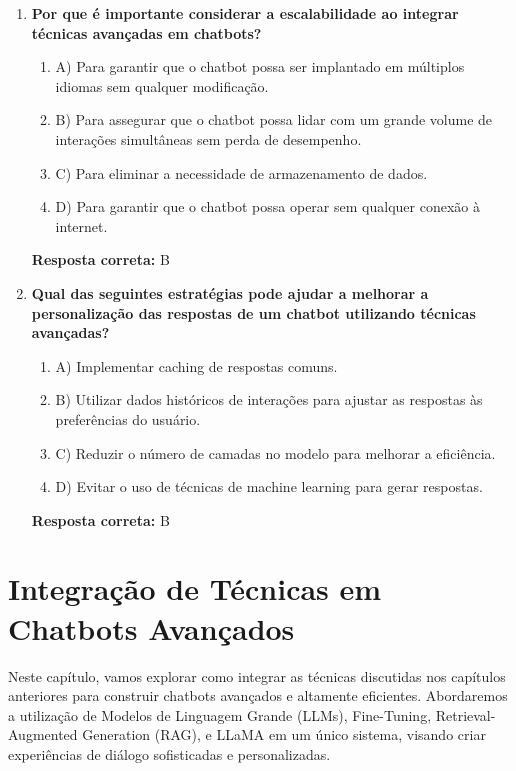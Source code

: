 \documentclass[14pt,a4paper,oneside]{book}
\begin{document}
\begin{enumerate}
	\item \textbf{Por que é importante considerar a escalabilidade ao integrar técnicas avançadas em chatbots?}
	\begin{enumerate}[label=\alph*)]
		\item A) Para garantir que o chatbot possa ser implantado em múltiplos idiomas sem qualquer modificação.
		\item B) Para assegurar que o chatbot possa lidar com um grande volume de interações simultâneas sem perda de desempenho.
		\item C) Para eliminar a necessidade de armazenamento de dados.
		\item D) Para garantir que o chatbot possa operar sem qualquer conexão à internet.
	\end{enumerate}
	\vspace{5mm}
	\textbf{Resposta correta:} B
	
	\item \textbf{Qual das seguintes estratégias pode ajudar a melhorar a personalização das respostas de um chatbot utilizando técnicas avançadas?}
	\begin{enumerate}[label=\alph*)]
		\item A) Implementar caching de respostas comuns.
		\item B) Utilizar dados históricos de interações para ajustar as respostas às preferências do usuário.
		\item C) Reduzir o número de camadas no modelo para melhorar a eficiência.
		\item D) Evitar o uso de técnicas de machine learning para gerar respostas.
	\end{enumerate}
	\vspace{5mm}
	\textbf{Resposta correta:} B
	
\end{enumerate}


\chapter{Integração de Técnicas em Chatbots Avançados}

Neste capítulo, vamos explorar como integrar as técnicas discutidas nos capítulos anteriores para construir chatbots avançados e altamente eficientes. Abordaremos a utilização de Modelos de Linguagem Grande (LLMs), Fine-Tuning, Retrieval-Augmented Generation (RAG), e LLaMA em um único sistema, visando criar experiências de diálogo sofisticadas e personalizadas.
\end{document}
